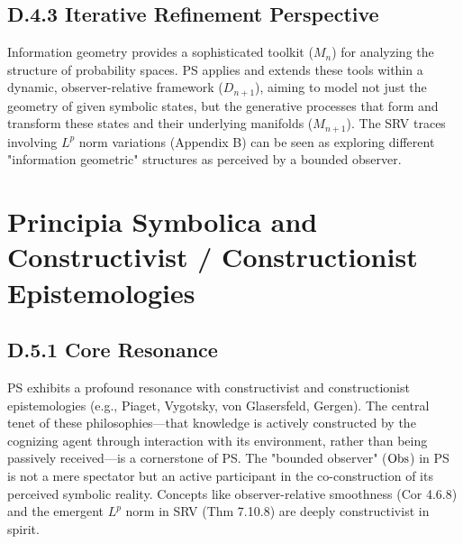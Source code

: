 \subsection*{D.4.3 Iterative Refinement Perspective}
\label{subsec:appD_info_geometry_iterative_refinement_perspective}
Information geometry provides a sophisticated toolkit (\(M_n\)) for analyzing the structure of probability spaces. PS applies and extends these tools within a dynamic, observer-relative framework (\(D_{n+1}\)), aiming to model not just the geometry of given symbolic states, but the generative processes that form and transform these states and their underlying manifolds (\(M_{n+1}\)). The SRV traces involving \(L^p\) norm variations (Appendix B) can be seen as exploring different "information geometric" structures as perceived by a bounded observer.
\section*{Principia Symbolica and Constructivist / Constructionist Epistemologies} \label{sec:appD_ps_and_constructivist_epistemologies}
\subsection*{D.5.1 Core Resonance}
\label{subsec:appD_constructivist_core_resonance}
PS exhibits a profound resonance with constructivist and constructionist epistemologies \cite{vonGlasersfeld1995} (e.g., Piaget, Vygotsky, von Glasersfeld, Gergen). The central tenet of these philosophies—that knowledge is actively constructed by the cognizing agent through interaction with its environment, rather than being passively received—is a cornerstone of PS. The "bounded observer" (\(\mathrm{Obs}\)) in PS is not a mere spectator but an active participant in the co-construction of its perceived symbolic reality. Concepts like observer-relative smoothness (Cor 4.6.8) and the emergent \(L^p\) norm in SRV (Thm 7.10.8) are deeply constructivist in spirit.
